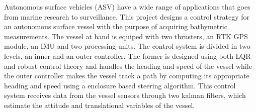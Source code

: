 Autonomous surface vehicles (ASV) have a wide range of applications that goes from marine research to surveillance. This project designs a control strategy for an autonomous surface vessel with the purpose of acquiring bathymetric measurements. The vessel at hand is equiped with two thrusters, an RTK GPS module, an IMU and two processing units. The control system is divided in two levels, an inner and an outer controller. The former is designed using both LQR and robust control theory and handles the heading and speed of the vessel while the outer controller makes the vessel track a path by computing its appropriate heading and speed using a enclosure based steering algorithm. This control system receives data from the vessel sensors through two kalman filters, which estimate the attitude and translational variables of the vessel.